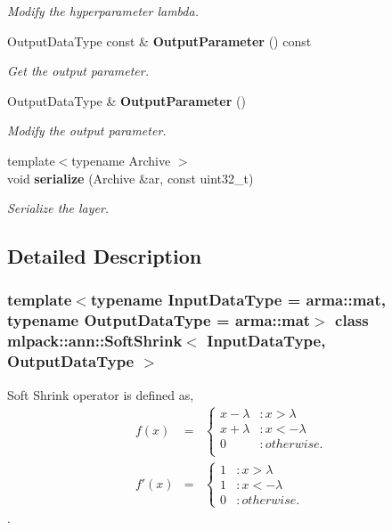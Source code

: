 \begin{DoxyCompactItemize}
\begin{DoxyCompactList}\small\item\em Modify the hyperparameter lambda. \end{DoxyCompactList}\item 
Output\+Data\+Type const  \& \textbf{ Output\+Parameter} () const
\begin{DoxyCompactList}\small\item\em Get the output parameter. \end{DoxyCompactList}\item 
Output\+Data\+Type \& \textbf{ Output\+Parameter} ()
\begin{DoxyCompactList}\small\item\em Modify the output parameter. \end{DoxyCompactList}\item 
{\footnotesize template$<$typename Archive $>$ }\\void \textbf{ serialize} (Archive \&ar, const uint32\+\_\+t)
\begin{DoxyCompactList}\small\item\em Serialize the layer. \end{DoxyCompactList}\end{DoxyCompactItemize}


\subsection{Detailed Description}
\subsubsection*{template$<$typename Input\+Data\+Type = arma\+::mat, typename Output\+Data\+Type = arma\+::mat$>$\newline
class mlpack\+::ann\+::\+Soft\+Shrink$<$ Input\+Data\+Type, Output\+Data\+Type $>$}

Soft Shrink operator is defined as, \begin{eqnarray*} f(x) &=& \begin{cases} x - \lambda & : x > \lambda \\ x + \lambda & : x < -\lambda \\ 0 & : otherwise. \\ \end{cases} \\ f'(x) &=& \begin{cases} 1 & : x > \lambda \\ 1 & : x < -\lambda \\ 0 & : otherwise. \end{cases} \end{eqnarray*}. 


